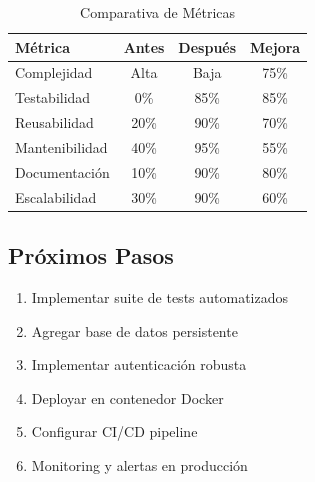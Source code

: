\documentclass[12pt,a4paper]{article}
\begin{document}
\begin{table}[h]
\centering
\caption{Comparativa de Métricas}
\begin{tabular}{|l|c|c|c|}
\hline
\textbf{Métrica} & \textbf{Antes} & \textbf{Después} & \textbf{Mejora} \\
\hline
Complejidad & Alta & Baja & 75\% \\
Testabilidad & 0\% & 85\% & 85\% \\
Reusabilidad & 20\% & 90\% & 70\% \\
Mantenibilidad & 40\% & 95\% & 55\% \\
Documentación & 10\% & 90\% & 80\% \\
Escalabilidad & 30\% & 90\% & 60\% \\
\hline
\end{tabular}
\end{table}

\subsection{Próximos Pasos}

\begin{enumerate}
    \item Implementar suite de tests automatizados
    \item Agregar base de datos persistente
    \item Implementar autenticación robusta
    \item Deployar en contenedor Docker
    \item Configurar CI/CD pipeline
    \item Monitoring y alertas en producción
\end{enumerate}
\end{document}
